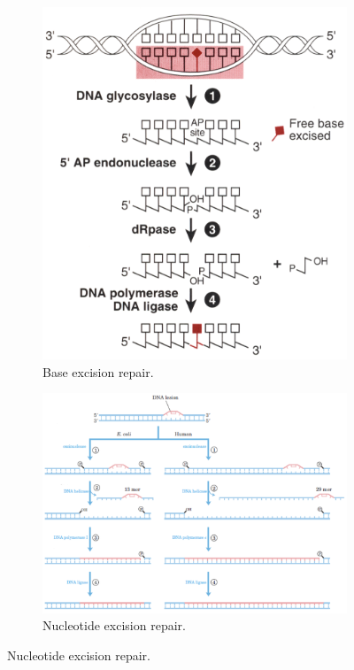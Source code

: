 \documentclass[../notes.tex]{subfiles}
\begin{document}
\begin{itemize}
\begin{figure}[H]
\begin{subfigure}[b]{0.35\linewidth}
            \includegraphics[width=0.98\linewidth]{../ExtFiles/DNARepaira.png}
            \caption{Base excision repair.}
            \label{fig:DNARepaira}
        \end{subfigure}
        \begin{subfigure}[b]{0.63\linewidth}
            \centering
            \includegraphics[width=0.9\linewidth]{../ExtFiles/DNARepairb.png}
            \caption{Nucleotide excision repair.}

\end{subfigure}
\end{figure}
\end{itemize}
\end{document}
